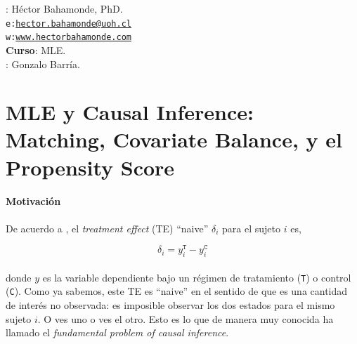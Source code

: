 \documentclass[onesided]{article}\usepackage[]{graphicx}\usepackage[]{color}
\begin{document}











\hspace{-5mm}{\bf Profesor}: H\'ector Bahamonde, PhD.\\
\texttt{e:}\href{mailto:hector.bahamonde@uoh.cl}{\texttt{hector.bahamonde@uoh.cl}}\\
\texttt{w:}\href{http://www.hectorbahamonde.com}{\texttt{www.hectorbahamonde.com}}\\
{\bf Curso}: MLE.\\
\hspace{-5mm}{\bf TA}: Gonzalo Barr\'ia.

\section{MLE y Causal Inference: Matching, Covariate Balance, y el Propensity Score}

\paragraph{Motivaci\'on} De acuerdo a \textcite[33]{Morgan:2007ty}, el \emph{treatment effect} (TE) ``naive'' $\delta_{i}$ para el sujeto $i$ es,

\begin{equation}\label{eqMETH:1}
\delta_{i} = y^{\texttt{T}}_{i} - y^{\texttt{C}}_{i}
\end{equation}

\paragraph{}donde $y$ es la variable dependiente bajo un r\'egimen de tratamiento (\texttt{T}) o control (\texttt{C}). Como ya sabemos, este TE es ``naive'' en el sentido de que es una cantidad de inter\'es no observada: es imposible observar los dos estados para el mismo sujeto $i$. O ves uno o ves el otro. Esto es lo que de manera muy conocida \textcite[947]{Holland1986a} ha llamado el \emph{fundamental problem of causal inference}.
\end{document}
